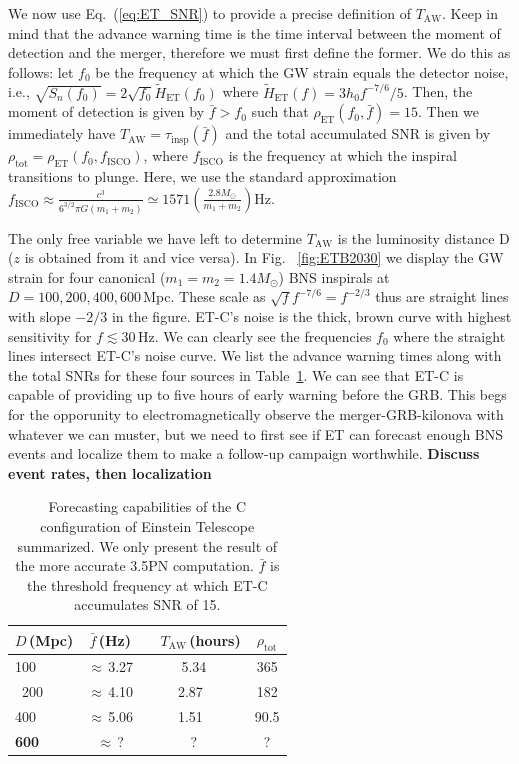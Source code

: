 \documentclass{aa}
\newcommand\T{\rule{0pt}{2.6ex}}       %
\begin{document}
We now use Eq.~(\ref{eq:ET_SNR}) to provide a precise definition of $T_\text{AW}$. Keep in mind
that the advance warning time is the time interval between the moment of detection and the merger,
therefore we must first define the former.
We do this as follows: let $f_0$ be the frequency
at which the GW strain equals the detector noise, i.e., $\sqrt{S_n(f_0)}=2\sqrt{f_0} \tilde{H}_\text{ET}(f_0)$ where $\tilde{H}_\text{ET}(f)=3 h_0 f^{-7/6}/5$.
Then, the moment of detection is given by 
$\bar{f}>f_0$ such that $\rho_\text{ET}(f_0,\bar{f})=15$. Then we immediately have
$T_\text{AW} = \tau_\text{insp}(\bar{f})$
and the total accumulated SNR is given by
$\rho_\text{tot}=\rho_\text{ET}(f_0, f_\text{ISCO})$, where
$f_\text{ISCO}$ is the frequency at which the inspiral transitions to plunge. Here, we use the standard approximation $f_\text{ISCO} \approx \tfrac{c^3}{6^{3/2}\pi G (m_1+m_2)} \simeq 1571 \left(\tfrac{2.8M_\odot}{m_1+m_2}\right)\text{Hz}$.

The only free variable we have left to determine
$T_\text{AW}$ is the luminosity distance D ($z$ is obtained from it and vice versa). In Fig.~
\ref{fig:ETB2030} we display the GW strain for four canonical ($m_1=m_2=1.4 M_\odot$) BNS inspirals at $D=100,200, 400, 600\,$Mpc. 
These scale as $ \sqrt{f} f^{-7/6} = f^{-2/3}$
thus are straight lines with slope $-2/3$ in the figure.
ET-C's
noise is the thick, brown curve with highest sensitivity for $f\lesssim 30\,$Hz. We can clearly see the frequencies $f_0$ where the
straight lines intersect ET-C's noise curve.
We list the advance warning times along with the total SNRs for these four sources in  Table~\ref{table:ET}.
We can see that ET-C is capable of providing
up to five hours of early warning before the GRB.
This begs for the opporunity to electromagnetically observe the merger-GRB-kilonova with whatever we can muster, 
but we need to first see if ET can forecast
enough BNS events and localize them to make
a follow-up campaign worthwhile.
{\bf Discuss event rates, then localization}

\begin{table}[h]
\caption{Forecasting capabilities of the C configuration of Einstein Telescope summarized. 
We only present the result of the more accurate 3.5PN computation. $\bar{f}$ is the threshold frequency at which
ET-C accumulates SNR of 15.}
\label{table:ET}
\centering
\begin{tabular}{lccc}
\hline\hline
$D\,$(Mpc) &   $\bar{f}\,$(Hz) & \ \hspace{5mm} $T_\text{AW}\,$(hours)& ${\rho}_\text{tot}$\T\\
\hline
100 & $\approx\,$3.27 & 5.34 & 365\\\
200 &  $\approx\,$4.10 & 2.87\ & 182 \\
400 &  $\approx\,$5.06 & 1.51\ & 90.5\\
{\bf 600} & $\approx\,$? & ? & ?  \\
\hline\hline
\end{tabular}
\end{table}
\end{document}
